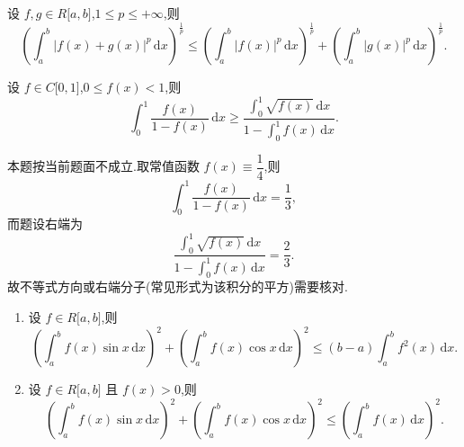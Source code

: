 \begin{theorem}
    设 $f,g\in R\lbrack a,b\rbrack$,$1\leq p\leq+\infty$,则
    \[
        \left(\int_a^b|f(x)+g(x)|^p\,\mathrm{d}x\right)^{\frac{1}{p}}
        \leq
        \left(\int_a^b|f(x)|^p\,\mathrm{d}x\right)^{\frac{1}{p}}
        +\left(\int_a^b|g(x)|^p\,\mathrm{d}x\right)^{\frac{1}{p}}.
    \]
\end{theorem}

\begin{example}
    设 $f\in C\lbrack 0,1\rbrack$,$0\leq f(x)<1$,则
    \[
        \displaystyle\int_0^1\dfrac{f(x)}{1-f(x)}\,\mathrm{d}x
        \geq
        \dfrac{\displaystyle\int_0^1\sqrt{f(x)}\,\mathrm{d}x}
        {1-\displaystyle\int_0^1f(x)\,\mathrm{d}x}.
    \]
\end{example}
\exampleblank

\begin{solution}
    本题按当前题面不成立.取常值函数 $f(x)\equiv\dfrac{1}{4}$,则
    \[
        \displaystyle\int_0^1\dfrac{f(x)}{1-f(x)}\,\mathrm{d}x
        =\dfrac{1}{3},
    \]
    而题设右端为
    \[
        \dfrac{\displaystyle\int_0^1\sqrt{f(x)}\,\mathrm{d}x}
        {1-\displaystyle\int_0^1f(x)\,\mathrm{d}x}
        =\dfrac{2}{3}.
    \]
    故不等式方向或右端分子(常见形式为该积分的平方)需要核对.
\end{solution}

\begin{example}
    \begin{enumerate}
        \item 设 $f\in R\lbrack a,b\rbrack$,则
              \[
                  \left(\int_a^bf(x)\sin x\,\mathrm{d}x\right)^2
                  +\left(\int_a^bf(x)\cos x\,\mathrm{d}x\right)^2
                  \leq(b-a)\int_a^bf^2(x)\,\mathrm{d}x.
              \]
        \item 设 $f\in R\lbrack a,b\rbrack$ 且 $f(x)>0$,则
              \[
                  \left(\int_a^bf(x)\sin x\,\mathrm{d}x\right)^2
                  +\left(\int_a^bf(x)\cos x\,\mathrm{d}x\right)^2
                  \leq\left(\int_a^bf(x)\,\mathrm{d}x\right)^2.
              \]
    \end{enumerate}
\end{example}
\exampleblank

